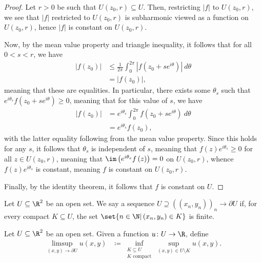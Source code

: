 \documentclass[10pt]{mypackage}
\renewcommand{\coloneq}{\coloneqq}
\begin{document}
\begin{proof}
  Let $r > 0$ be such that $U\left( z_0,r \right)\subseteq U$. Then, restricting $\left\vert f \right\vert$ to $U\left( z_0,r \right)$, we see that $\left\vert f \right\vert$ restricted to $U\left( z_0,r \right)$ is subharmonic viewed as a function on $U\left( z_0,r \right)$, hence $\left\vert f \right\vert$ is constant on $U\left( z_0,r \right)$.%

  Now, by the mean value property and triangle inequality, it follows that for all $0 < s < r$, we have
  \begin{align*}
    \left\vert f\left( z_0 \right) \right\vert &\leq \frac{1}{2\pi} \int_{0}^{2\pi} \left\vert f\left( z_0 + se^{i\theta} \right) \right\vert\:d\theta\\
                                               &= \left\vert f\left( z_0 \right) \right\vert,
  \end{align*}
  meaning that these are equalities. In particular, there exists some $\theta_s$ such that $e^{i\theta_s} f\left( z_0 + se^{i\theta} \right) \geq 0$, meaning that for this value of $s$, we have
  \begin{align*}
    \left\vert f\left( z_0 \right) \right\vert &= e^{i\theta_s} \int_{0}^{2\pi} f\left( z_0 + se^{i\theta} \right)\:d\theta\\
                                               &= e^{i\theta_s} f\left( z_0 \right),
  \end{align*}
  with the latter equality following from the mean value property. Since this holds for any $s$, it follows that $\theta_s$ is independent of $s$, meaning that $f(z)e^{i\theta_s} \geq 0$ for all $z\in U\left( z_0,r \right)$, meaning that $\im\left( e^{i\theta_s}f\left( z \right) \right) = 0$ on $U\left( z_0,r \right)$, whence $f(z)e^{i\theta_s}$ is constant, meaning $f$ is constant on $U\left( z_0,r \right)$.%

  Finally, by the identity theorem, it follows that $f$ is constant on $U$.
\end{proof}
\begin{definition}
  Let $U\subseteq \R^{2}$ be an open set. We say a sequence $U\supseteq \left( \left( x_n,y_n \right) \right)_n\rightarrow \partial U$ if, for every compact $K\subseteq U$, the set $\set{n\in \N | \left( x_n,y_n \right)\in K}$ is finite.
\end{definition}
\begin{definition}
  Let $U\subseteq \R^{2}$ be an open set. Given a function $u\colon U\rightarrow \R$, define
  \begin{align*}
    \limsup_{\left( x,y \right)\rightarrow \partial U} u\left( x,y \right) &\coloneq \inf_{\substack{K\subseteq U\\K\text{ compact}}} \sup_{\left( x,y \right)\in U\setminus K} u\left( x,y \right).
  \end{align*}
\end{definition}
\end{document}
